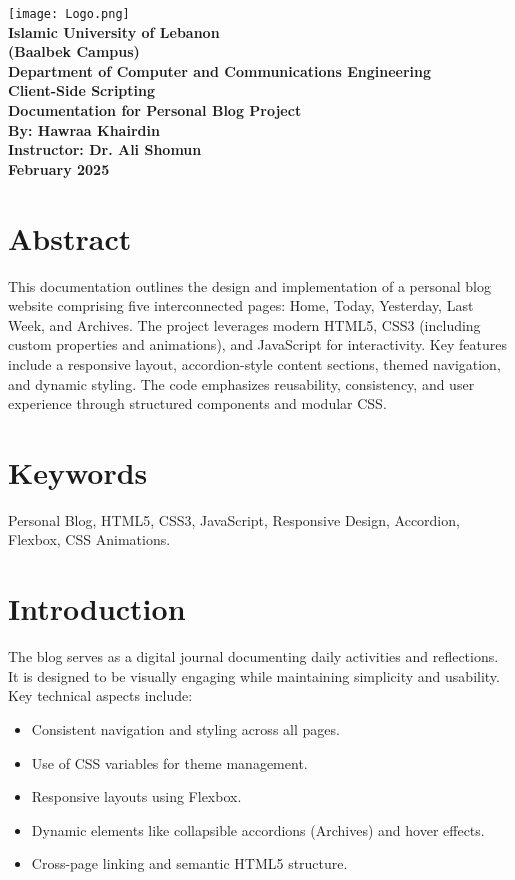 \documentclass[a4paper,12pt]{article}
\begin{document}
\begin{titlepage}
    \centering
    \texttt{[image: Logo.png]} \\[2cm]
    \textbf{\Large{Islamic University of Lebanon}} \\[0.5cm]
    \textbf{\large{(Baalbek Campus)}} \\[1cm]
    \textbf{\large{Department of Computer and Communications Engineering}} \\[3cm]
    \textbf{\Large{Client-Side Scripting}} \\[1cm]
    \textbf{\large{Documentation for Personal Blog Project}} \\[4cm]
    \textbf{\large{By: Hawraa Khairdin}} \\[1cm]
    \textbf{\large{Instructor: Dr. Ali Shomun}} \\[2cm]
    \textbf{\large{February 2025}}
\end{titlepage}

\newpage
\pagestyle{empty}
\tableofcontents
\newpage
\pagestyle{fancy}
\setcounter{page}{1}

\section{Abstract}
This documentation outlines the design and implementation of a personal blog website comprising five interconnected pages: Home, Today, Yesterday, Last Week, and Archives. The project leverages modern HTML5, CSS3 (including custom properties and animations), and JavaScript for interactivity. Key features include a responsive layout, accordion-style content sections, themed navigation, and dynamic styling. The code emphasizes reusability, consistency, and user experience through structured components and modular CSS.

\section{Keywords}
Personal Blog, HTML5, CSS3, JavaScript, Responsive Design, Accordion, Flexbox, CSS Animations.

\section{Introduction}
The blog serves as a digital journal documenting daily activities and reflections. It is designed to be visually engaging while maintaining simplicity and usability. Key technical aspects include:
\begin{itemize}
    \item Consistent navigation and styling across all pages.
    \item Use of CSS variables for theme management.
    \item Responsive layouts using Flexbox.
    \item Dynamic elements like collapsible accordions (Archives) and hover effects.
    \item Cross-page linking and semantic HTML5 structure.
\end{itemize}
\end{document}
